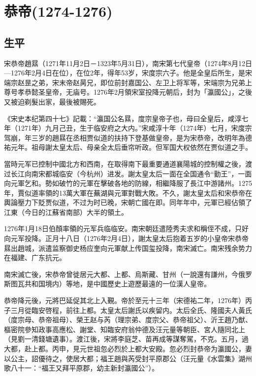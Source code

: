 
\section{恭帝\tiny(1274-1276)}

\subsection{生平}

宋恭帝趙㬎（1271年11月2日－1323年5月31日），南宋第七代皇帝（1274年8月12日—1276年2月4日在位），在位2年，得年53岁，宋度宗六子。他是全皇后所生，是宋端宗赵昰之弟，宋末帝赵昺兄，即位前封嘉国公、左卫上将军等，宋端宗为兄弟上尊号孝恭懿圣皇帝，无庙号。1276年2月領宋室投降元朝后，封为「瀛國公」，之後又被迫剃髮出家，最後被賜死。

《宋史本纪第四十七》記載：“瀛国公名㬎，度宗皇帝子也，母曰全皇后，咸淳七年（1271年）九月己丑，生于临安府之大内。”宋咸淳十年（1274年）七月，宋度宗驾崩，年三岁的趙㬎在丞相贾似道的扶持下登基做皇帝，是为宋恭帝，改明年為德祐元年。祖母謝太皇太后、母亲全太后垂帘听政。但军国大权依然在贾似道之手。

當時元军已控制中國北方和西南，在取得南下最重要通道襄陽城的控制權之後，渡过长江向南宋都城临安（今杭州）进发。謝太皇太后一面在全国通令“勤王”，一面向元軍乞和。勢如破竹的元軍在擊破各地的防線，相繼降服了長江中游諸州。1275年，賈似道率領的13萬大軍在蕪湖與元軍對戰大敗。不久，謝太皇太后和宋恭帝在輿論壓力下貶贾似道，不过为时已晚，宋朝亡國在即。同年年中，元軍已經佔領了江東（今日的江蘇省南部）大半的領土。

1276年1月18日伯顏率領的元军兵临临安。南宋朝廷遣陸秀夫求和稱侄不成，只好向元军投降。正月十八日（1276年2月4日），謝太皇太后抱着五岁的小皇帝宋恭帝㬎出趙城，派遣监察御史杨应奎向元軍献上传国玺投降，南宋滅亡。南宋残余势力在福建、广东抗元。

南宋滅亡後，宋恭帝曾徙居元大都、上都、烏斯藏、甘州（一說還有謙州，今俄罗斯图瓦共和国境内）等地，是中國歷史上遊歷最遠的一位漢人皇帝。

恭帝降元後，元將巴延促其北上入覲。帝於至元十三年（宋德祐二年，1276年）丙子三月從臨安啓程，前往上都。太皇太后謝氏以疾留内。太后全氏、隆國夫人黃氏（度宗母、恭帝祖母）、榮王赵与芮（理宗弟、度宗父、恭帝祖父）、沂王趙乃猷、樞密院參知政事高應松、謝堂、知臨安府翁仲德及汪元量等朝臣、宮人隨同北上（見劉一清錢塘遺事）。渡江後，宋將李庭芝、苗再成等謀奪駕，不克。五月，過大都，赴上都。丙申，見元世祖忽必烈於上都大安殿。忽必烈封恭帝为瀛國公，妻以公主，詔優待之，使居大都；福王趙與芮受封平原郡公（汪元量《水雲集》湖州歌八十一：“福王又拜平原郡，幼主新封瀛國公”）。

